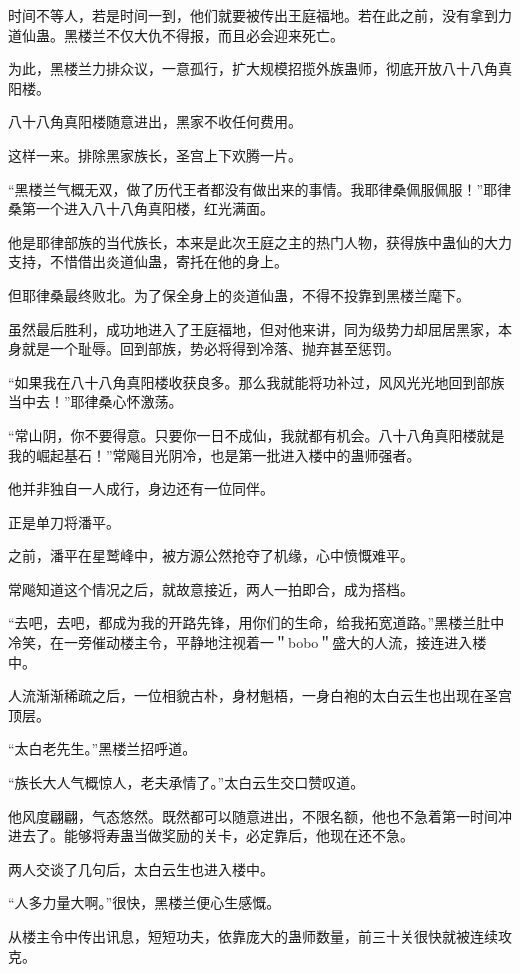 \begin{this_body}
时间不等人，若是时间一到，他们就要被传出王庭福地。若在此之前，没有拿到力道仙蛊。黑楼兰不仅大仇不得报，而且必会迎来死亡。

为此，黑楼兰力排众议，一意孤行，扩大规模招揽外族蛊师，彻底开放八十八角真阳楼。

八十八角真阳楼随意进出，黑家不收任何费用。

这样一来。排除黑家族长，圣宫上下欢腾一片。

“黑楼兰气概无双，做了历代王者都没有做出来的事情。我耶律桑佩服佩服！”耶律桑第一个进入八十八角真阳楼，红光满面。

他是耶律部族的当代族长，本来是此次王庭之主的热门人物，获得族中蛊仙的大力支持，不惜借出炎道仙蛊，寄托在他的身上。

但耶律桑最终败北。为了保全身上的炎道仙蛊，不得不投靠到黑楼兰麾下。

虽然最后胜利，成功地进入了王庭福地，但对他来讲，同为级势力却屈居黑家，本身就是一个耻辱。回到部族，势必将得到冷落、抛弃甚至惩罚。

“如果我在八十八角真阳楼收获良多。那么我就能将功补过，风风光光地回到部族当中去！”耶律桑心怀激荡。

“常山阴，你不要得意。只要你一日不成仙，我就都有机会。八十八角真阳楼就是我的崛起基石！”常飚目光阴冷，也是第一批进入楼中的蛊师强者。

他并非独自一人成行，身边还有一位同伴。

正是单刀将潘平。

之前，潘平在星鹫峰中，被方源公然抢夺了机缘，心中愤慨难平。

常飚知道这个情况之后，就故意接近，两人一拍即合，成为搭档。

“去吧，去吧，都成为我的开路先锋，用你们的生命，给我拓宽道路。”黑楼兰肚中冷笑，在一旁催动楼主令，平静地注视着一＂bobo＂盛大的人流，接连进入楼中。

人流渐渐稀疏之后，一位相貌古朴，身材魁梧，一身白袍的太白云生也出现在圣宫顶层。

“太白老先生。”黑楼兰招呼道。

“族长大人气概惊人，老夫承情了。”太白云生交口赞叹道。

他风度翩翩，气态悠然。既然都可以随意进出，不限名额，他也不急着第一时间冲进去了。能够将寿蛊当做奖励的关卡，必定靠后，他现在还不急。

两人交谈了几句后，太白云生也进入楼中。

“人多力量大啊。”很快，黑楼兰便心生感慨。

从楼主令中传出讯息，短短功夫，依靠庞大的蛊师数量，前三十关很快就被连续攻克。


\end{this_body}
